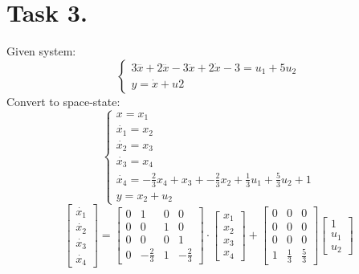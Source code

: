 \documentclass[a4paper,12pt]{article}
\begin{document}
\section{Task 3.}
Given system:
$$
\begin{cases}
    3\ddddot{x}+2\dddot{x}-3\ddot{x}+2\dot{x}-3=u_1+5u_2\\
    y=\dot{x}+u2
\end{cases}
$$
Convert to space-state:
$$
\begin{cases}
    x=x_1\\
    \dot{x_1}=x_2\\
    \dot{x_2}=x_3\\
    \dot{x_3}=x_4\\
    \dot{x_4}=-\frac{2}{3}x_4+x_3+-\frac{2}{3}x_2
    +\frac{1}{3}u_1+\frac{5}{3}u_2+1\\
    y=x_2+u_2
\end{cases}
$$
\begin{equation*}
    \begin{bmatrix}
        \dot{x_1}\\ \dot{x_2} \\
        \dot{x_3}\\ \dot{x_4}
    \end{bmatrix}
    =
    \begin{bmatrix}
        0 & 1 & 0 & 0\\
        0 & 0 & 1 & 0\\
        0 & 0 & 0 & 1\\
        0 & -\frac{2}{3} & 1 & -\frac{2}{3}
    \end{bmatrix}
    \cdot
    \begin{bmatrix}
        x_1 \\ x_2 \\ x_3 \\x_4
    \end{bmatrix}
    +
    \begin{bmatrix}
        0 & 0 & 0 \\
        0 & 0 & 0 \\
        0 & 0 & 0 \\
        1 & \frac{1}{3} & \frac{5}{3}
    \end{bmatrix}
    \begin{bmatrix}
        1 \\ u_1 \\ u_2
    \end{bmatrix}
\end{equation*}
\end{document}
